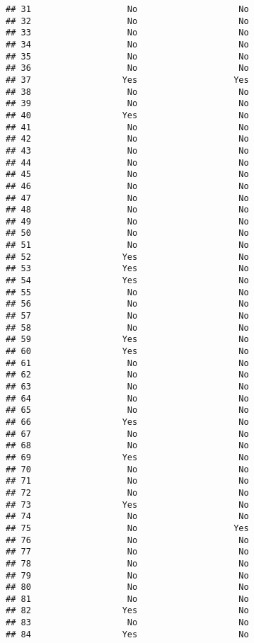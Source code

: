 \documentclass[
]{article}
\begin{document}
\begin{verbatim}
## 31                   No                    No
## 32                   No                    No
## 33                   No                    No
## 34                   No                    No
## 35                   No                    No
## 36                   No                    No
## 37                  Yes                   Yes
## 38                   No                    No
## 39                   No                    No
## 40                  Yes                    No
## 41                   No                    No
## 42                   No                    No
## 43                   No                    No
## 44                   No                    No
## 45                   No                    No
## 46                   No                    No
## 47                   No                    No
## 48                   No                    No
## 49                   No                    No
## 50                   No                    No
## 51                   No                    No
## 52                  Yes                    No
## 53                  Yes                    No
## 54                  Yes                    No
## 55                   No                    No
## 56                   No                    No
## 57                   No                    No
## 58                   No                    No
## 59                  Yes                    No
## 60                  Yes                    No
## 61                   No                    No
## 62                   No                    No
## 63                   No                    No
## 64                   No                    No
## 65                   No                    No
## 66                  Yes                    No
## 67                   No                    No
## 68                   No                    No
## 69                  Yes                    No
## 70                   No                    No
## 71                   No                    No
## 72                   No                    No
## 73                  Yes                    No
## 74                   No                    No
## 75                   No                   Yes
## 76                   No                    No
## 77                   No                    No
## 78                   No                    No
## 79                   No                    No
## 80                   No                    No
## 81                   No                    No
## 82                  Yes                    No
## 83                   No                    No
## 84                  Yes                    No

\end{verbatim}
\end{document}
